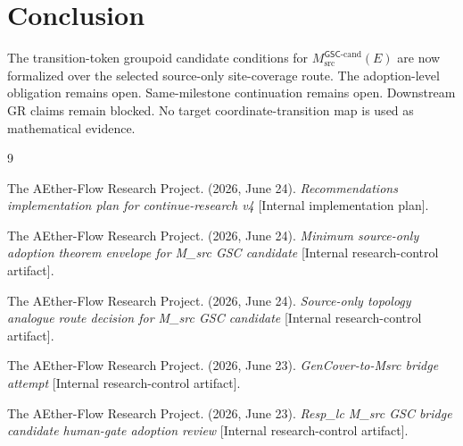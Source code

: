 \documentclass[11pt]{article}
\newcommand{\GSC}{\mathsf{GSC}}
\newcommand{\Mgsccand}{M_{\mathrm{src}}^{\GSC\mbox{-}\mathrm{cand}}}
\begin{document}
\section{Conclusion}

The transition-token groupoid candidate conditions for \(\Mgsccand(E)\) are
now formalized over the selected source-only site-coverage route. The
adoption-level obligation remains open. Same-milestone continuation remains
open. Downstream GR claims remain blocked. No target coordinate-transition
map is used as mathematical evidence.

\begin{thebibliography}{9}

The AEther-Flow Research Project. (2026, June 24). \emph{Recommendations
implementation plan for continue-research v4} [Internal implementation plan].

The AEther-Flow Research Project. (2026, June 24). \emph{Minimum source-only
adoption theorem envelope for M\_src GSC candidate} [Internal
research-control artifact].

The AEther-Flow Research Project. (2026, June 24). \emph{Source-only
topology analogue route decision for M\_src GSC candidate} [Internal
research-control artifact].

The AEther-Flow Research Project. (2026, June 23). \emph{GenCover-to-Msrc
bridge attempt} [Internal research-control artifact].

The AEther-Flow Research Project. (2026, June 23). \emph{Resp\_lc M\_src GSC
bridge candidate human-gate adoption review} [Internal research-control
artifact].

\end{thebibliography}
\end{document}
